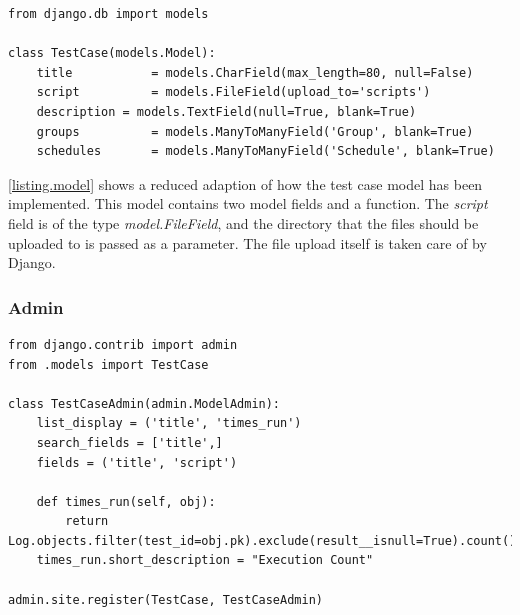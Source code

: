 \vspace{4mm}
\noindent\begin{minipage}{\textwidth}
\begin{lstlisting}[caption=Model Implementation, label={listing.model}]
from django.db import models
 
class TestCase(models.Model):
    title           = models.CharField(max_length=80, null=False)
    script          = models.FileField(upload_to='scripts')
    description = models.TextField(null=True, blank=True)
    groups          = models.ManyToManyField('Group', blank=True)
    schedules       = models.ManyToManyField('Schedule', blank=True)
\end{lstlisting}
\end{minipage}

\lstlistingname \space \ref{listing.model} shows a reduced adaption of how the test case model has been implemented. This model contains two model fields and a function. The \emph{script} field is of the type \emph{model.FileField}, and the directory that the files should be uploaded to is passed as a parameter. The file upload itself is taken care of by Django.





\subsubsection{Admin}


\vspace{4mm}
\begin{lstlisting}[caption=Implementation of Model in Administrator Interface, label={listing.modeladmin}, float=bp, floatplacement=btp]
from django.contrib import admin
from .models import TestCase

class TestCaseAdmin(admin.ModelAdmin):
    list_display = ('title', 'times_run')
    search_fields = ['title',]
    fields = ('title', 'script')
    
    def times_run(self, obj):
        return Log.objects.filter(test_id=obj.pk).exclude(result__isnull=True).count()
    times_run.short_description = "Execution Count"
 
admin.site.register(TestCase, TestCaseAdmin)
\end{lstlisting}

